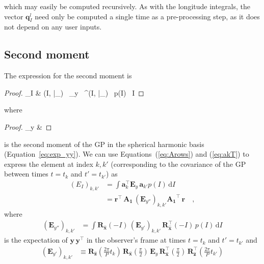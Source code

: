\documentclass[modern]{aastex62}
\begin{document}
%
which may easily be computed recursively.
As with the longitude integrals, the vector
$\mathbf{q}^l_I$ need only be computed a single
time as a pre-processing step, as it does not
depend on any user inputs.

\subsection{Second moment}
\label{sec:inc-mom2}
%
The expression for the second moment is
%
\begin{proof}{}
    _I
    & \equiv
    \int
    (I, \bar{\pmb{\theta}}_\star) \,
    _y \,
    ^\top(I, \bar{\pmb{\theta}}_\star) \,
    p(I) \,
    I
\end{proof}
%
where
%
\begin{proof}{}
    _y
    & \equiv
     
\end{proof}
%
is the second moment of the GP in the spherical harmonic basis
(Equation~\ref{eq:exp_yy}). We can use Equations~(\ref{eq:Arows})
and (\ref{eq:akT})
to express the element at index $k, k'$ (corresponding to the covariance of the
GP between times $t = t_k$ and $t' = t_{k'}$) as
%
\begin{align}
    \label{eq:Eikkp}
    \left(E_I\right)_{k, k'}
     & =
    \int
    \mathbf{a}_k^\top
    \mathbf{E}_y \,
    \mathbf{a}_{k'}
    p(I) \,
    \mathrm{d}I
    \nonumber \\
     & =
    \mathbf{r}^\top \,
    \mathbf{A_1} \,
    \left(\mathbf{E}_{y''}\right)_{k,k'}
    \mathbf{A_1}^\top \,
    \mathbf{r}
    \quad,
\end{align}
%
where
%
\begin{align}
    \label{eq:Eyppkkp}
    \left(\mathbf{E}_{y''}\right)_{k,k'}
     & =
    \int
    \mathbf{R}_{\hat{\mathbf{x}}}\left(-I\right) \,
    \left(\mathbf{E}_{y'}\right)_{k,k'} \,
    \mathbf{R}_{\hat{\mathbf{x}}}^\top\left(-I\right) \,
    p(I) \,
    \mathrm{d}I
\end{align}
%
is the expectation of $\mathbf{y}\,\mathbf{y}^\top$ in the
observer's frame at times $t = t_k$ and $t' = t_{k'}$
and
%
\begin{align}
    \left(\mathbf{E}_{y'}\right)_{k,k'}
     & \equiv
    \mathbf{R}_{\hat{\mathbf{z}}}\left(\frac{2\pi}{P}t_k\right) \,
    \mathbf{R}_{\hat{\mathbf{x}}}\left(\frac{\pi}{2}\right) \,
    \mathbf{E}_y \,
    \mathbf{R}_{\hat{\mathbf{x}}}^\top\left(\frac{\pi}{2}\right) \,
    \mathbf{R}_{\hat{\mathbf{z}}}^\top\left(\frac{2\pi}{P}t_{k'}\right)
\end{align}
\end{document}
